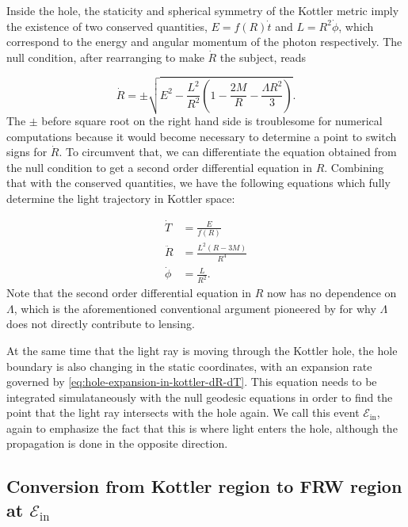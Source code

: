 Inside the hole, the staticity and spherical symmetry of the Kottler metric imply the existence of two conserved quantities, $E = f(R) \dot{t}$ and $L = R^2 \dot{\phi}$, which correspond to the energy and angular momentum of the photon respectively. The null condition, after rearranging to make $\dot{R}$ the subject, reads

\begin{equation}
  \dot{R} = \pm \sqrt{E^2 - \frac{L^2}{R^2} \left ( 1 - \frac{2M}{R} - \frac{\Lambda R^2}{3}\right )}.
  \label{eq:kottler-null-condition}
\end{equation}
The $\pm$ before square root on the right hand side is troublesome for numerical computations because it would become necessary to determine a point to switch signs for $\dot{R}$. To circumvent that, we can differentiate the equation obtained from the null condition to get a second order differential equation in $R$. Combining that with the conserved quantities, we have the following equations which fully determine the light trajectory in Kottler space:

\begin{subequations}
  \begin{align}
    \dot{T} &= \frac{E}{f(R)}\\
    \ddot{R}  &= \frac{L^2 (R-3M)}{R^4}\\
    \dot{\phi} &= \frac{L}{R^2}.
  \end{align}
  \label{eq:kottler-null-geodesics}%
\end{subequations}
Note that the second order differential equation in $R$ now has no dependence on $\Lambda$, which is the aforementioned conventional argument pioneered by \citet{islam1983cosmological} for why $\Lambda$ does not directly contribute to lensing. 

At the same time that the light ray is moving through the Kottler hole, the hole boundary is also changing in the static coordinates, with an expansion rate governed by \autoref{eq:hole-expansion-in-kottler-dR-dT}. This equation needs to be integrated simulataneously with the null geodesic equations in order to find the point that the light ray intersects with the hole again. We call this event $\mathcal{E}_{\text{in}}$, again to emphasize the fact that this is where light enters the hole, although the propagation is done in the opposite direction. 

\subsection{Conversion from Kottler region to FRW region at $\mathcal{E}_{\text{in}}$}

